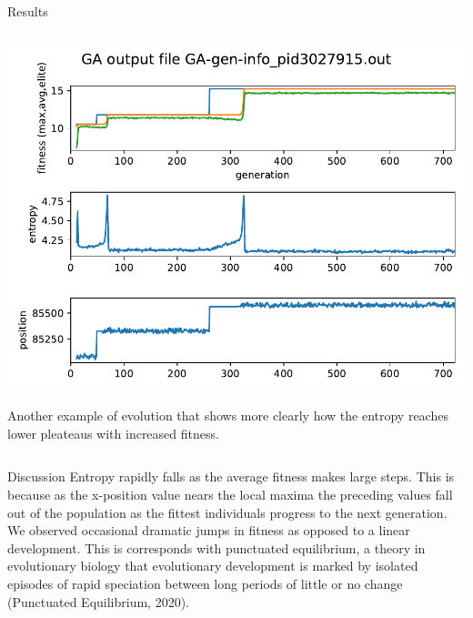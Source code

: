 \documentclass[10pt,aspectratio=169]{beamer}
\begin{document}
\begin{frame}{Results}
\begin{columns}
    \begin{column}{0.6\textwidth}
     \includegraphics[width=\textwidth]{GA-gen-info_pid3027915.out.pdf}\\ {\tiny
      				\begin{singlespace}
      				Another example of evolution that shows more clearly how
      				the entropy reaches lower pleateaus with increased fitness.
      				\end{singlespace}	
      		}
    \end{column}
  \end{columns}
\end{frame}

\begin{frame}{Discussion}
	Entropy rapidly falls as the average fitness makes large steps. This
	is because as the x-position value nears the local maxima the
	preceding values fall out of the population as the fittest individuals
	progress to the next generation. We observed occasional dramatic jumps
	in fitness as opposed to a linear development. This is corresponds
	with punctuated equilibrium, a theory in evolutionary biology that
	evolutionary development is marked by isolated episodes of rapid
	speciation between long periods of little or no change (Punctuated
	Equilibrium, 2020).
\end{frame}
\end{document}

